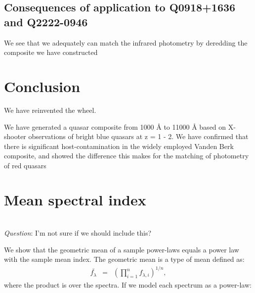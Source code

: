 \documentclass{aa}    %
\newcommand{\eqlabel}[1]{\label{eq:#1}}
\newcommand{\sectlabel}[1]{\label{sect:#1}}
\newcommand{\todo}[3]{{\color{#2}\emph{#1}: #3}}
\newcommand{\qtodo}[1]{\todo{\\ Question}{red}{#1}}
\begin{document}
\subsection{Consequences of application to Q0918+1636 and Q2222-0946}
We see that we adequately can match the infrared photometry by deredding the composite we have constructed



\section{Conclusion}  \sectlabel{conclusion}


We have reinvented the wheel.

We have generated a quasar composite from 1000 \r{A} to 11000 \r{A} based on X-shooter observations of bright blue quasars at z = 1 - 2. We have confirmed that there is significant host-contamination in the widely employed Vanden Berk composite, and showed the difference this makes for the matching of photometry of red quasars


%
 

%
%


%





\appendix

\section{Mean spectral index}  \sectlabel{math}

\qtodo{I'm not sure if we should include this?}

We show that the geometric mean of a sample power-laws equals a power law with the sample mean index. The geometric mean is a type of mean defined as:
\begin{eqnarray}\eqlabel{geometric mean}
\bar{f_{\lambda}} &=&  \left( \prod_{i=1}^n f_{\lambda, i} \right) ^{1/n},
\end{eqnarray}
where the product is over the spectra. If we model each spectrum as a power-law:
\end{document}
